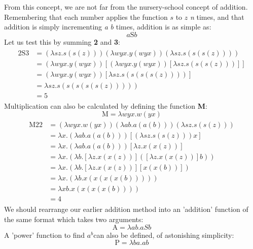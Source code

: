 \documentclass {article}
\begin{document}
From this concept, we are not far from the nursery-school concept of addition. Remembering that each number applies the function $s$ to $z$ \textit{n} times, and that addition is simply incrementing \textit{a} \textit{b} times, addition is as simple as:
\begin{equation*}
a\bm{\mathrm{S}}b	
\end{equation*}
Let us test this by summing \textbf{2} and \textbf{3}:
\begin{gather*}
\begin{aligned}
\bm{\mathrm{2S3}} &= (\lambda sz.s(s(z))) (\lambda wyx.y(wyx)) (\lambda sz.s(s(s(z))))\\
&= (\lambda wyx.y(wyx)) [(\lambda wyx.y(wyx)) [\lambda sz.s(s(s(z)))]]\\
&= (\lambda wyx.y(wyx)) [\lambda sz.s(s(s(s(z))))]\\
&= \lambda sz.s(s(s(s(s(z)))))\\
&= \bm{\mathrm{5}}
\end{aligned}
\end{gather*}
Multiplication can also be calculated by defining the function \textbf{M}:
\begin{equation*}
\bm{\mathrm{M}} = \lambda wyx.w(yx)
\end{equation*}
\begin{gather*}
\begin{aligned}
\bm{\mathrm{M22}} &= (\lambda wyx.w(yx))(\lambda ab.a(a(b)))(\lambda sz.s(s(z)))\\
&= \lambda x.(\lambda ab.a(a(b)))[(\lambda sz.s(s(z)))x]\\
&= \lambda x.(\lambda ab.a(a(b)))[\lambda z.x(x(z))]\\
&= \lambda x.(\lambda b.[\lambda z.x(x(z))]([\lambda z.x(x(z))]b))\\
&= \lambda x.(\lambda b.[\lambda z.x(x(z))][x(x(b))])\\
&= \lambda x.(\lambda b.x(x(x(x(b)))))\\
&= \lambda xb.x(x(x(x(b))))\\
&= \bm{\mathrm{4}}
\end{aligned}
\end{gather*}
We should rearrange our earlier addition method into an 'addition' function of the same format which takes two arguments:
\begin{equation*}
\bm{\mathrm{A}} = \lambda ab.aSb
\end{equation*}
A 'power' function to find $a^b$can also be defined, of astonishing simplicity:
\begin{equation*}
\bm{\mathrm{P}} = \lambda ba.ab
\end{equation*}
\end{document}

